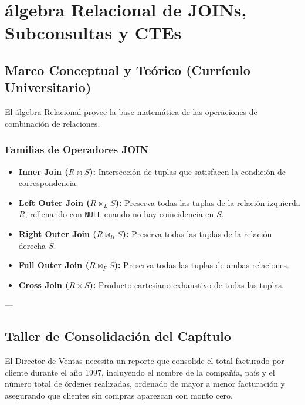 \chapter{\'algebra Relacional de JOINs, Subconsultas y CTEs}
\label{cap:algebra_joins_subconsultas}

\section{Marco Conceptual y Te\'orico (Curr\'iculo Universitario)}

El \'algebra Relacional provee la base matem\'atica de las operaciones de combinaci\'on de relaciones.

\subsection{Familias de Operadores JOIN}
\begin{itemize}
    \item \textbf{Inner Join ($R \bowtie S$):} Intersecci\'on de tuplas que satisfacen la condici\'on de correspondencia.
    \item \textbf{Left Outer Join ($R \bowtie_{L} S$):} Preserva todas las tuplas de la relaci\'on izquierda $R$, rellenando con \texttt{NULL} cuando no hay coincidencia en $S$.
    \item \textbf{Right Outer Join ($R \bowtie_{R} S$):} Preserva todas las tuplas de la relaci\'on derecha $S$.
    \item \textbf{Full Outer Join ($R \bowtie_{F} S$):} Preserva todas las tuplas de ambas relaciones.
    \item \textbf{Cross Join ($R \times S$):} Producto cartesiano exhaustivo de todas las tuplas.
\end{itemize}

---

\section{Taller de Consolidaci\'on del Cap\'itulo}

\begin{businessproblem}
El Director de Ventas necesita un reporte que consolide el total facturado por cliente durante el a\~no 1997, incluyendo el nombre de la compa\~n\'ia, pa\'is y el n\'umero total de \'ordenes realizadas, ordenado de mayor a menor facturaci\'on y asegurando que clientes sin compras aparezcan con monto cero.
\end{businessproblem}


